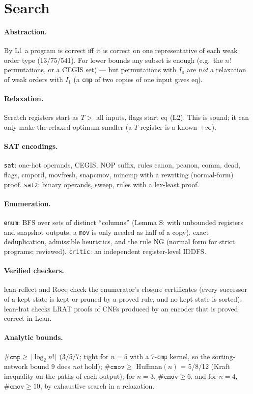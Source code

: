 \documentclass[11pt]{article}
\theoremstyle{remark}\newtheorem{remark}[theorem]{Remark}
\begin{document}
\section{Search}\label{sec:search}
\paragraph{Abstraction.} By L1 a program is correct iff it is correct on one representative of each weak order type
(13/75/541). For lower bounds any subset is enough (e.g.\ the $n!$ permutations, or a CEGIS set) --- but permutations with
$I_0$ are \emph{not} a relaxation of weak orders with $I_1$ (a \texttt{cmp} of two copies of one input gives eq).
\paragraph{Relaxation.} Scratch registers start as $T > $ all inputs, flags start eq (L2). This is sound; it can only make
the relaxed optimum smaller (a $T$ register is a known $+\infty$).
\paragraph{SAT encodings.} \texttt{sat}: one-hot operands, CEGIS, NOP suffix, rules canon, pcanon, comm, dead, flags, cmpord, movfresh,
snapcmov, mincmp with a rewriting (normal-form) proof. \texttt{sat2}: binary operands, sweep, rules with a lex-least proof.
\paragraph{Enumeration.} \texttt{enum}: BFS over sets of distinct ``columns'' (Lemma S: with unbounded registers and snapshot
outputs, a \texttt{mov} is only needed as half of a copy), exact deduplication, admissible heuristics, and the rule NG
(normal form for strict programs; reviewed). \texttt{critic}: an independent register-level IDDFS.
\paragraph{Verified checkers.} lean-reflect and Rocq check the enumerator's closure certificates (every successor of a kept
state is kept or pruned by a proved rule, and no kept state is sorted); lean-lrat checks LRAT proofs of CNFs produced by an
encoder that is proved correct in Lean.
\paragraph{Analytic bounds.} $\#\texttt{cmp} \ge \lceil\log_2 n!\rceil$ (3/5/7; tight for $n=5$ with a 7-\texttt{cmp} kernel,
so the sorting-network bound 9 does \emph{not} hold); $\#\texttt{cmov} \ge$ Huffman$(n)$ = 5/8/12 (Kraft inequality on the
paths of each output); for $n=3$, $\#\texttt{cmov} \ge 6$, and for $n=4$, $\#\texttt{cmov} \ge 10$, by exhaustive search in a
relaxation.
\end{document}
